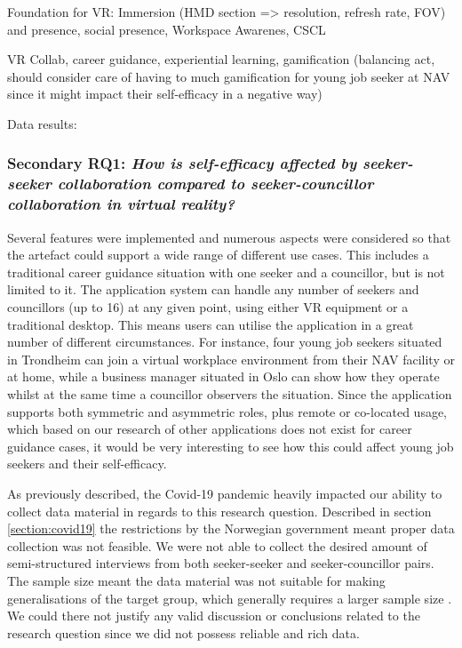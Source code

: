 Foundation for VR: Immersion (HMD section => resolution, refresh rate, FOV) and presence, social presence, Workspace Awarenes, CSCL

VR Collab, career guidance, experiential learning, gamification (balancing act, should consider care of having to much gamification for young job seeker at NAV since it might impact their self-efficacy in a negative way) 

Data results: 


\subsubsection{Secondary RQ1: \textit{How is self-efficacy affected by seeker-seeker collaboration compared to seeker-councillor collaboration in virtual reality?}} 

Several features were implemented and numerous aspects were considered so that the artefact could support a wide range of different use cases. This includes a traditional career guidance situation with one seeker and a councillor, but is not limited to it. The application system can handle any number of seekers and councillors (up to 16) at any given point, using either VR equipment or a traditional desktop. This means users can utilise the application in a great number of different circumstances. For instance, four young job seekers situated in Trondheim can join a virtual workplace environment from their NAV facility or at home, while a business manager situated in Oslo can show how they operate whilst at the same time a councillor observers the situation.           
Since the application supports both symmetric and asymmetric roles, plus remote or co-located usage, which based on our research of other applications does not exist for career guidance cases, it would be very interesting to see how this could affect young job seekers and their self-efficacy. 


As previously described, the Covid-19 pandemic heavily impacted our ability to collect data material in regards to this research question. Described in section \ref{section:covid19} the restrictions by the Norwegian government meant proper data collection was not feasible. We were not able to collect the desired amount of semi-structured interviews from both seeker-seeker and seeker-councillor pairs. The sample size meant the data material was not suitable for making generalisations of the target group, which generally requires a larger sample size \cite{oates2005researching}. We could there not justify any valid discussion or conclusions related to the research question since we did not possess reliable and rich data.                

